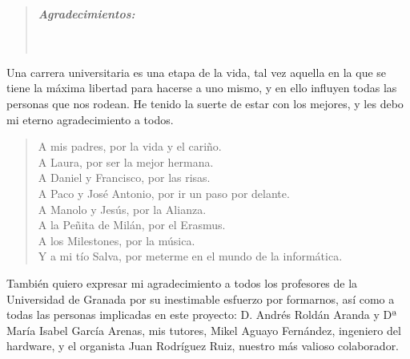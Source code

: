 \cleardoublepage
{}
{}

\vspace*{2.5cm}


\begin{quotation}
\noindent \begin{center}
\textbf{\emph{\Large Agradecimientos:}}\textbf{\emph{\large }}\\
\textbf{\emph{\large }}\\
\textbf{\emph{\large }}\\
\textbf{\emph{\large }}
\par\end{center}{\large \par}
\end{quotation}

\begin{onehalfspace}

Una carrera universitaria es una etapa de la vida, tal vez aquella en la que se tiene la máxima libertad para hacerse a uno mismo, y en ello influyen todas las personas que nos rodean. He tenido la suerte de estar con los mejores, y les debo mi eterno agradecimiento a todos.

\begin{quote}
	A mis padres, por la vida y el cariño. \\
	A Laura, por ser la mejor hermana. \\
	A Daniel y Francisco, por las risas. \\
	A Paco y José Antonio, por ir un paso por delante. \\
	A Manolo y Jesús, por la Alianza. \\
	A la Peñita de Milán, por el Erasmus. \\
	A los Milestones, por la música. \\
	Y a mi tío Salva, por meterme en el mundo de la informática.
\end{quote}

También quiero expresar mi agradecimiento a todos los profesores de la Universidad de Granada por su inestimable esfuerzo por formarnos, así como a todas las personas implicadas en este proyecto: D. Andrés Roldán Aranda y Dª María Isabel García Arenas, mis tutores, Mikel Aguayo Fernández, ingeniero del hardware, y el organista Juan Rodríguez Ruiz, nuestro más valioso colaborador.

\end{onehalfspace}


\clearpage{\pagestyle{empty}\cleardoublepage}%
